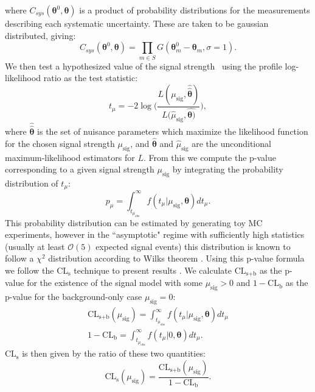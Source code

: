 where $C_{sys}(\boldsymbol{\theta}^0,\boldsymbol{\theta})$ is a product of probability distributions for the measurements describing each systematic uncertainty. These are taken to be gaussian distributed, giving:
\begin{equation}
C_{sys}(\boldsymbol{\theta}^0,\boldsymbol{\theta}) = \prod_{m\in S} G(\boldsymbol{\theta}^{0}_{m} - \boldsymbol{\theta}_m, \sigma = 1).
\end{equation}
We then test a hypothesized value of the signal strength \mu~using the profile log-likelihood ratio as the test statistic:
\begin{equation}
\label{eq:prof_likelihood_ratio}
t_{\mu} = -2\log\Bigg( \frac{L(\mu_\text{sig}, \hat{\hat{\boldsymbol{\theta}}})}{L(\hat{\mu}_\text{sig}, \hat{\boldsymbol{\theta})}} \Bigg),
\end{equation}
where $\hat{\hat{\boldsymbol{\theta}}}$ is the set of nuisance parameters which maximize the likelihood function for the chosen signal strength $\mu_{\text{sig}}$, and $\hat{\boldsymbol{\theta}}$ and $\hat{\mu}_{\text{sig}}$ are the unconditional maximum-likelihood estimators for $L$. From this we compute the p-value corresponding to a given signal strength $\mu_{\text{sig}}$ by integrating the probability distribution of $t_{\mu}$:
\begin{equation}
p_{\mu} = \int_{t_{\mu_\text{obs}}}^\infty f(t_{\mu}|\mu_\text{sig}, \boldsymbol{\theta})dt_{\mu}.
\end{equation}
This probability distribution can be estimated by generating toy MC experiments, however in the ``asymptotic" regime with sufficiently high statistics (usually at least $\mathcal{O}(5)$ expected signal events) this distribution is known to follow a $\chi^2$ distribution according to Wilks theorem \cite{Wilks}.
Using this p-value formula we follow the $\text{CL}_\text{s}$ technique to present results \cite{CLs}. We calculate $\text{CL}_\text{s+b}$ as the p-value for the existence of the signal model with some $\mu_{\text{sig}} > 0$ and $1 - \text{CL}_\text{b}$ as the p-value for the background-only case $\mu_{\text{sig}} = 0$:
\begin{equation}
\begin{gathered}
\text{CL}_\text{s+b}(\mu_\text{sig}) = \int_{t_{\mu_\text{obs}}}^\infty f(t_{\mu}|\mu_\text{sig}, \boldsymbol{\theta})dt_{\mu} \\
1 - \text{CL}_\text{b} = \int_{t_{\mu_\text{obs}}}^\infty f(t_{\mu}|0, \boldsymbol{\theta})dt_{\mu}.
\end{gathered}
\end{equation}
$\text{CL}_\text{s}$ is then given by the ratio of these two quantities:
\begin{equation}
\text{CL}_\text{s}(\mu_\text{sig}) = \frac{\text{CL}_\text{s+b}(\mu_\text{sig})}{1 - \text{CL}_\text{b}}.
\end{equation}

